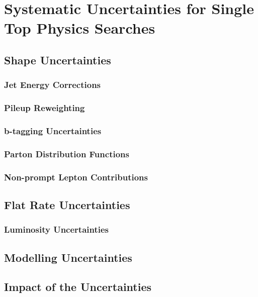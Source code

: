 \section{Systematic Uncertainties for Single Top Physics Searches}\label{sec:tzq-systematics}

\subsection{Shape Uncertainties}
\subsubsection{Jet Energy Corrections}
\subsubsection{Pileup Reweighting}
\subsubsection{b-tagging Uncertainties}
\subsubsection{Parton Distribution Functions}
\subsubsection{Non-prompt Lepton Contributions}

\subsection{Flat Rate Uncertainties}
\subsubsection{Luminosity Uncertainties}

\subsection{Modelling Uncertainties}

\subsection{Impact of the Uncertainties}